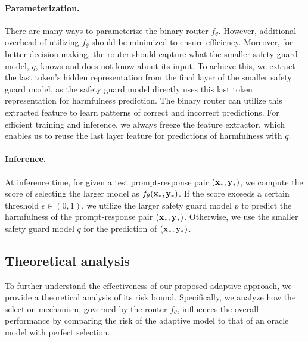 \paragraph{Parameterization.} There are many ways to parameterize the binary router $f_\theta$. However, additional overhead of utilizing $f_\theta$ should be minimized to ensure efficiency. Moreover, for better decision-making, the router should capture what the smaller safety guard model, $q$, knows and does not know about its input. To achieve this, we extract the last token’s hidden representation from the final layer of the smaller safety guard model, as the safety guard model directly uses this last token representation for harmfulness prediction. The binary router can utilize this extracted feature to learn patterns of correct and incorrect predictions. For efficient training and inference, we always freeze the feature extractor, which enables us to reuse the last layer feature for predictions of harmfulness with $q$.


\paragraph{Inference.} At inference time, for given a test prompt-response pair $({\mathbf{x}}_*, {\mathbf{y}}_*)$, we compute the score of selecting the larger model as $f_\theta({\mathbf{x}}_*, {\mathbf{y}}_*)$. If the score exceeds a certain threshold $\epsilon \in (0,1)$, we utilize the larger safety guard model $p$ to predict the harmfulness of the prompt-response pair $({\mathbf{x}}_*, {\mathbf{y}}_*)$. Otherwise, we use the smaller safety guard model $q$ for the prediction of $({\mathbf{x}}_*, {\mathbf{y}}_*)$.



\subsection{Theoretical analysis} To further understand the effectiveness of our proposed adaptive approach, we provide a theoretical analysis of its risk bound. Specifically, we analyze how the selection mechanism, governed by the router $f_\theta$, influences the overall performance by comparing the risk of the adaptive model to that of an oracle model with perfect selection.

